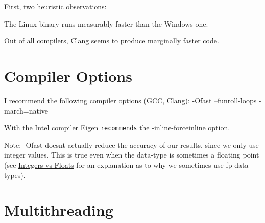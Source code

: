 First, two heuristic observations\+:


\begin{DoxyItemize}
\item The Linux binary runs measurably faster than the Windows one.
\item Out of all compilers, Clang seems to produce marginally faster code.
\end{DoxyItemize}\hypertarget{perf_compoptions}{}\section{Compiler Options}\label{perf_compoptions}

\begin{DoxyItemize}
\item I recommend the following compiler options (G\+CC, Clang)\+: {\ttfamily -\/\+Ofast --funroll-\/loops -\/march=native }
\item With the Intel compiler \hyperlink{namespaceEigen}{Eigen} \href{ http://eigen.tuxfamily.org/index.php?title=Main_Page#Compiler_support}{\tt recommends} the {\ttfamily -\/inline-\/forceinline} option.
\item Note\+: {\ttfamily -\/\+Ofast} doesn\textquotesingle{}t actually reduce the accuracy of our results, since we only use integer values. This is true even when the data-\/type is sometimes a floating point (see \hyperlink{perf_intvsfloat}{Integers vs Floats} for an explanation as to why we sometimes use fp data types).
\end{DoxyItemize}\hypertarget{perf_thread}{}\section{Multithreading}\label{perf_thread}

